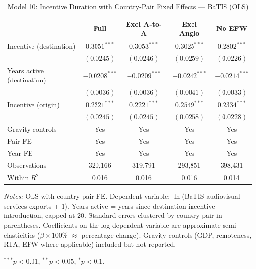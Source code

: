 \begin{table}[htbp]
\centering
\caption{Model 10: Incentive Duration with Country-Pair Fixed Effects --- BaTIS (OLS)}
\label{tab:batis_model10}
\footnotesize
\begin{tabular}{l cccc}
\toprule
  & Full & Excl A-to-A & Excl Anglo & No EFW \\
\midrule
Incentive (destination) & $0.3051^{***}$ & $0.3053^{***}$ & $0.3025^{***}$ & $0.2802^{***}$ \\
 & $(0.0245)$ & $(0.0246)$ & $(0.0259)$ & $(0.0226)$ \\[4pt]
Years active (destination) & $-0.0208^{***}$ & $-0.0209^{***}$ & $-0.0242^{***}$ & $-0.0214^{***}$ \\
 & $(0.0036)$ & $(0.0036)$ & $(0.0041)$ & $(0.0033)$ \\[4pt]
Incentive (origin) & $0.2221^{***}$ & $0.2221^{***}$ & $0.2549^{***}$ & $0.2334^{***}$ \\
 & $(0.0245)$ & $(0.0245)$ & $(0.0258)$ & $(0.0228)$ \\[4pt]
\midrule
Gravity controls & Yes & Yes & Yes & Yes \\
Pair FE & Yes & Yes & Yes & Yes \\
Year FE & Yes & Yes & Yes & Yes \\
Observations & 320,166 & 319,791 & 293,851 & 398,431 \\
Within $R^2$ & 0.016 & 0.016 & 0.016 & 0.014 \\
\bottomrule
\end{tabular}
\par\vspace{4pt}\noindent\begin{minipage}{\textwidth}
\footnotesize
\par \textit{Notes:} OLS with country-pair FE. Dependent variable: $\ln$(BaTIS audiovisual services exports + 1). Years active = years since destination incentive introduction, capped at 20. Standard errors clustered by country pair in parentheses. Coefficients on the log-dependent variable are approximate semi-elasticities ($\beta \times 100\%$ $\approx$ percentage change). Gravity controls (GDP, remoteness, RTA, EFW where applicable) included but not reported.
\par $^{***}p<0.01$, $^{**}p<0.05$, $^{*}p<0.1$.
\end{minipage}
\end{table}

\clearpage

